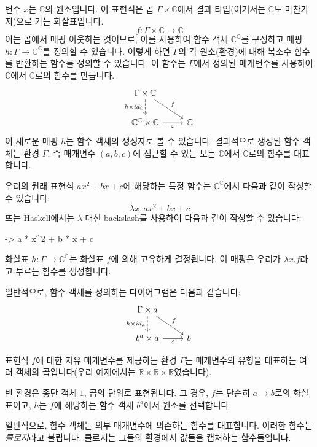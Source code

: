 \documentclass[DaoFP]{subfiles}
\begin{document}
변수 $x$는 $\mathbb{C}$의 원소입니다. 이 표현식은 곱 $\Gamma \times \mathbb{C}$에서 결과 타입(여기서는 $\mathbb{C}$도 마찬가지)으로 가는 화살표입니다.
\[f \colon \Gamma \times \mathbb{C} \to \mathbb{C} \]
이는 곱에서 매핑 아웃하는 것이므로, 이를 사용하여 함수 객체 $\mathbb{C}^{\mathbb{C}}$를 구성하고 매핑 $h \colon \Gamma \to \mathbb{C}^{\mathbb{C}}$를 정의할 수 있습니다. 이렇게 하면 $\Gamma$의 각 원소(환경)에 대해 복소수 함수를 반환하는 함수를 정의할 수 있습니다. 이 함수는 $\Gamma$에서 정의된 매개변수를 사용하여 $\mathbb{C}$에서 $\mathbb{C}$로의 함수를 만듭니다.
\[
 \begin{tikzcd}
 \Gamma \times \mathbb{C}
 \arrow[d, dashed, "h \times id_{\mathbb{C}}"']
 \arrow[rd, "f"]
 \\
 \mathbb{C}^{\mathbb{C}} \times \mathbb{C}
 \arrow[r, "\varepsilon"']
& \mathbb{C}
 \end{tikzcd}
\]
이 새로운 매핑 $h$는 함수 객체의 생성자로 볼 수 있습니다. 결과적으로 생성된 함수 객체는 환경 $\Gamma$, 즉 매개변수 $(a, b, c)$에 접근할 수 있는 모든 $\mathbb{C}$에서 $\mathbb{C}$로의 함수를 대표합니다.

우리의 원래 표현식 $a x^2 + b x + c$에 해당하는 특정 함수는 $\mathbb{C}^{\mathbb{C}}$에서 다음과 같이 작성할 수 있습니다:
\[  \lambda x . \,a x^2 + b x + c \]
또는 Haskell에서는 $\lambda$ 대신 backslash를 사용하여 다음과 같이 작성할 수 있습니다:
\begin{haskell}
\x -> a * x^2 + b * x + c
\end{haskell}

화살표 $h \colon \Gamma \to \mathbb{C}^{\mathbb{C}}$는 화살표 $f$에 의해 고유하게 결정됩니다. 이 매핑은 우리가 $\lambda x . f$라고 부르는 함수를 생성합니다.

일반적으로, 함수 객체를 정의하는 다이어그램은 다음과 같습니다:
\[
 \begin{tikzcd}
 \Gamma \times a
 \arrow[d, dashed, "{h \times id_a}"']
 \arrow[rd, "f"]
 \\
 b^a \times a
 \arrow[r, "\varepsilon"']
& b
 \end{tikzcd}
\]

표현식 $f$에 대한 자유 매개변수를 제공하는 환경 $\Gamma$는 매개변수의 유형을 대표하는 여러 객체의 곱입니다(우리 예제에서는 $\mathbb{R} \times \mathbb{R} \times \mathbb{R}$였습니다).

빈 환경은 종단 객체 $1$, 곱의 단위로 표현됩니다. 그 경우, $f$는 단순히 $a \to b$로의 화살표이고, $h$는 $f$에 해당하는 함수 객체 $b^a$에서 원소를 선택합니다.

일반적으로, 함수 객체는 외부 매개변수에 의존하는 함수를 대표합니다. 이러한 함수는 \emph{클로저}라고 불립니다. 클로저는 그들의 환경에서 값들을 캡처하는 함수들입니다.
\end{document}
